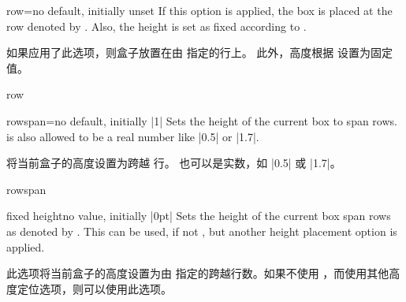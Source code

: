 \begin{posterlocTcbKey}[][doc new=2017-07-03]{row}{=}{no default, initially unset}
If this option is applied, the box is placed at the row denoted by .
Also, the height is set as fixed according to .

如果应用了此选项，则盒子放置在由  指定的行上。
此外，高度根据  设置为固定值。
\begin{exdispExample}{row}
\begin{tcbposter}[
poster = {showframe,height=2.5cm,spacing=2mm,rows=2},
boxes  = {beamer,colframe=blue!50!black,colback=blue!50,colupper=yellow!50},
]
\end{tcbposter}
\end{exdispExample}
\end{posterlocTcbKey}

\begin{posterlocTcbKey}[][doc new=2017-07-03]{rowspan}{=}{no default, initially |1|}
Sets the height of the current box to span  rows.
 is also allowed to be a real number like |0.5| or |1.7|.

将当前盒子的高度设置为跨越  行。 也可以是实数，如 |0.5| 或 |1.7|。
\begin{exdispExample}{rowspan}
\begin{tcbposter}[
poster = {showframe,height=2.5cm,spacing=2mm,rows=2},
boxes  = {beamer,colframe=blue!50!black,colback=blue!50,colupper=yellow!50},
]
\end{tcbposter}
\end{exdispExample}
\end{posterlocTcbKey}

\begin{posterlocTcbKey}[][doc new=2017-07-03]{fixed height}{}{no value, initially |0pt|}
Sets the height of the current box span rows as denoted by
.
This can be used, if not , but another
height placement option is applied.

此选项将当前盒子的高度设置为由  指定的跨越行数。如果不使用 ，而使用其他高度定位选项，则可以使用此选项。
\end{posterlocTcbKey}


